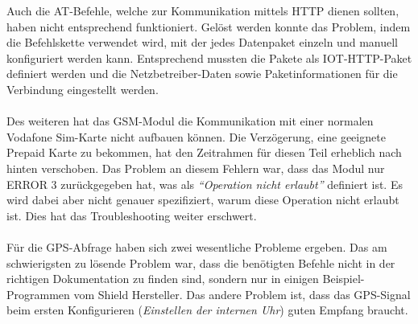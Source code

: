 Auch die AT-Befehle, welche zur Kommunikation mittels HTTP dienen sollten, haben nicht entsprechend funktioniert. Gelöst werden konnte das Problem, indem die Befehlskette verwendet wird, mit der jedes Datenpaket einzeln und manuell konfiguriert werden kann. Entsprechend mussten die Pakete als IOT-HTTP-Paket definiert werden und die Netzbetreiber-Daten sowie Paketinformationen für die Verbindung eingestellt werden.
\\
\\
Des weiteren hat das GSM-Modul die Kommunikation mit einer normalen Vodafone Sim-Karte nicht aufbauen können. Die Verzögerung, eine geeignete Prepaid Karte zu bekommen, hat den Zeitrahmen für diesen Teil erheblich nach hinten verschoben.
Das Problem an diesem Fehlern war, dass das Modul nur ERROR 3 zurückgegeben hat, was als \textit{“Operation nicht erlaubt”} definiert ist. Es wird dabei aber nicht genauer spezifiziert, warum diese Operation nicht erlaubt ist. Dies hat das Troubleshooting weiter erschwert.
\\
\\
Für die GPS-Abfrage haben sich zwei wesentliche Probleme ergeben. Das am schwierigsten zu lösende Problem war, dass die benötigten Befehle nicht in der richtigen Dokumentation zu finden sind, sondern nur in einigen Beispiel-Programmen vom Shield Hersteller. Das andere Problem ist, dass das GPS-Signal beim ersten Konfigurieren (\textit{Einstellen der internen Uhr}) guten Empfang braucht.

